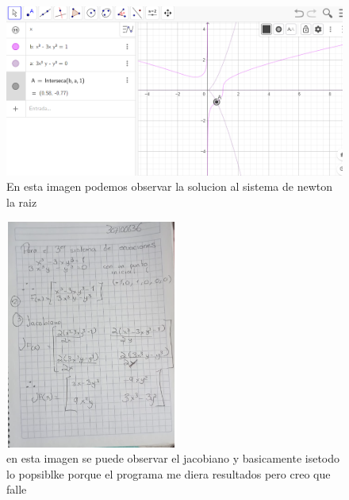\documentclass{article}
\begin{document}
\begin{figure}
        \centering
        \includegraphics[width=1.5\linewidth]{raiz newton 3er sistema.PNG}
        \caption{En esta imagen podemos observar la solucion al sistema de newton la raiz}
        \label{fig:enter-label}
    \end{figure}
    
\begin{figure}
            \centering
            \includegraphics[width=.75\linewidth]{jacobiano del tercer sistema.PNG}
            \caption{en esta imagen se puede observar el jacobiano y basicamente  isetodo lo popsiblke porque el programa me diera resultados pero creo que falle }
            \label{fig:enter-label}
        \end{figure}
              
  
       
\end{document}
